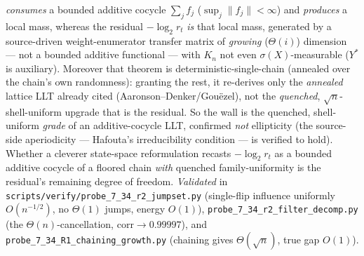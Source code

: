 \documentclass[
]{article}
\begin{document}
\emph{consumes} a bounded additive cocycle $\sum_j f_j$ ($\sup_j\|f_j\|<\infty$) and \emph{produces} a
local mass, whereas the residual $-\log_2 r_t$ \emph{is} that local mass, generated by a source-driven
weight-enumerator transfer matrix of \emph{growing} ($\Theta(i)$) dimension --- not a bounded additive
functional --- with $K_n$ not even $\sigma(X)$-measurable ($Y^*$ is auxiliary). Moreover that theorem is
deterministic-single-chain (annealed over the chain's own randomness): granting the rest, it re-derives
only the \emph{annealed} lattice LLT already cited (Aaronson--Denker/Gou\"ezel), not the \emph{quenched},
$\sqrt n$-shell-uniform upgrade that is the residual. So the wall is the quenched, shell-uniform
\emph{grade} of an additive-cocycle LLT, confirmed \emph{not} ellipticity (the source-side aperiodicity ---
Hafouta's irreducibility condition --- is verified to hold). Whether a cleverer state-space reformulation
recasts $-\log_2 r_t$ as a bounded additive cocycle of a floored chain \emph{with} quenched family-uniformity
is the residual's remaining degree of freedom. \emph{Validated} in \texttt{scripts/verify/probe\_7\_34\_r2\_jumpset.py} (single-flip
influence uniformly $O(n^{-1/2})$, no $\Theta(1)$ jumps, energy $O(1)$),
\texttt{probe\_7\_34\_r2\_filter\_decomp.py} (the $\Theta(n)$-cancellation, $\mathrm{corr}\to0.99997$),
and \texttt{probe\_7\_34\_R1\_chaining\_growth.py} (chaining gives $\Theta(\sqrt n)$, true gap $O(1)$).
\end{document}

